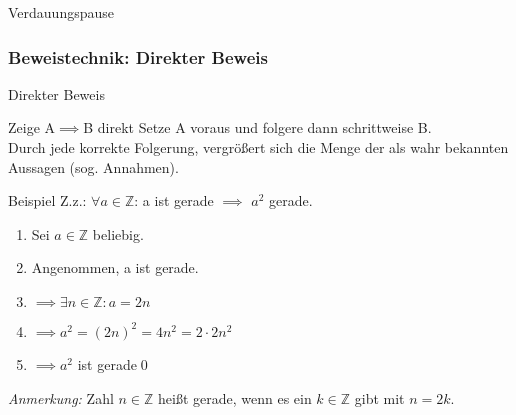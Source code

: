 \documentclass[10pt]{beamer}
\begin{document}
\begin{frame}[standout]
    Verdauungspause
\end{frame}

\subsubsection{Beweistechnik: Direkter Beweis}
\begin{frame}[fragile]{Direkter Beweis}
    \begin{alertblock}{Zeige A$\implies$B direkt}
    Setze A voraus und folgere dann schrittweise B.\\
    Durch jede korrekte Folgerung, vergrößert sich die Menge der als wahr bekannten Aussagen (sog. Annahmen).
    \end{alertblock}
    \begin{exampleblock}{Beispiel}
    Z.z.: \alert<2>{$\forall a\in\mathbb{Z}$}: \alert<3>{a ist gerade} $\implies$ \alert<6>{$a^2$ gerade.}
    \begin{enumerate}
        \item \alert<2>{Sei $a\in\mathbb{Z}$ beliebig.}
        \item \alert<3>{Angenommen, a ist gerade.}
        \item \alert<4>{$\implies \exists n\in\mathbb{Z} : a = 2n$}
        \item \alert<5>{$\implies a^2 = (2n)^2 = 4n^2 = 2 \cdot 2n^2$}
        \item \alert<6>{$\implies a^2$ ist gerade}\qed\;
    \end{enumerate}
    \end{exampleblock}
    \small{\emph{\alert<4>{Anmerkung:}} Zahl $n\in\mathbb{Z}$ heißt gerade, wenn es ein $k\in\mathbb{Z}$ gibt mit $n=2k$.}
\end{frame}
\end{document}
